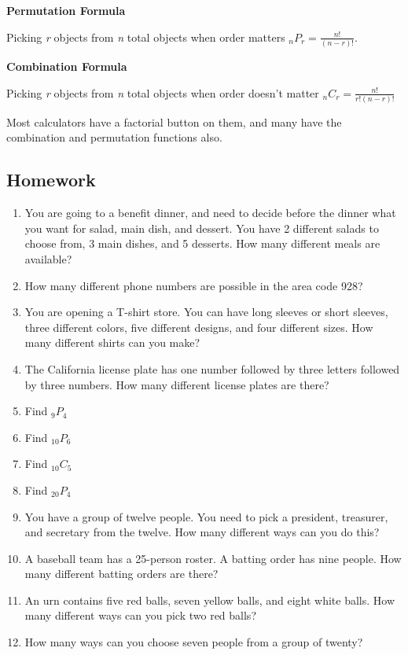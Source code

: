 \documentclass[
]{book}
\begin{document}
\textbf{Permutation Formula}

Picking \emph{r} objects from \emph{n} total objects when order matters \(_{n}P_{r}=\frac{n!}{(n-r)!}\).

\textbf{Combination Formula}

Picking \emph{r} objects from \emph{n} total objects when order doesn't matter \(_{n}C_{r}=\frac{n!}{r!(n-r)!}\)

Most calculators have a factorial button on them, and many have the combination and permutation functions also.

\hypertarget{homework-3}{%
\subsection{Homework}\label{homework-3}}

\begin{enumerate}
\def\labelenumi{\arabic{enumi}.}
\item
  You are going to a benefit dinner, and need to decide before the dinner what you want for salad, main dish, and dessert. You have 2 different salads to choose from, 3 main dishes, and 5 desserts. How many different meals are available?
\item
  How many different phone numbers are possible in the area code 928?
\item
  You are opening a T-shirt store. You can have long sleeves or short sleeves, three different colors, five different designs, and four different sizes. How many different shirts can you make?
\item
  The California license plate has one number followed by three letters followed by three numbers. How many different license plates are there?
\item
  Find \(_9P_4\)
\item
  Find \(_{10}P_6\)
\item
  Find \(_{10}C_5\)
\item
  Find \(_{20}P_4\)
\item
  You have a group of twelve people. You need to pick a president, treasurer, and secretary from the twelve. How many different ways can you do this?
\item
  A baseball team has a 25-person roster. A batting order has nine people. How many different batting orders are there?
\item
  An urn contains five red balls, seven yellow balls, and eight white balls. How many different ways can you pick two red balls?
\item
  How many ways can you choose seven people from a group of twenty?
\end{enumerate}
\end{document}
